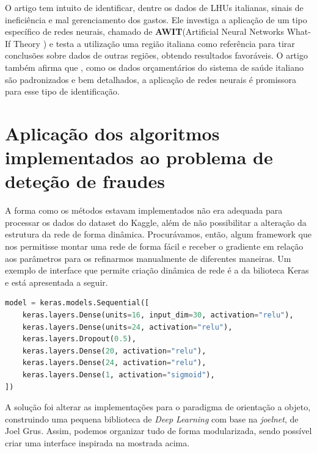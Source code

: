 \documentclass[11pt]{article}
\begin{document}
\noindent
O artigo \cite{fraudeItalia2} tem intuito de identificar, dentre os dados de LHUs italianas, sinais de ineficiência e mal gerenciamento dos gastos. Ele investiga a aplicação de um tipo específico de redes neurais, chamado de \textbf{AWIT}\supercite{AWIT}(Artificial Neural Networks What-If Theory ) e testa a utilização uma região italiana como referência para tirar conclusões sobre dados de outras regiões, obtendo  resultados favoráveis. O artigo também afirma que , como os dados orçamentários do sistema de saúde italiano são padronizados e bem detalhados, a aplicação de redes neurais é promissora para esse tipo de identificação.


\section{Aplicação dos algoritmos implementados ao problema de deteção de fraudes}

A forma como os métodos estavam implementados não era adequada para processar os dados do dataset do Kaggle, além de não possibilitar a alteração da estrutura da rede de forma dinâmica. Procurávamos, então, algum framework que nos permitisse montar uma rede de forma fácil e receber o gradiente em relação aos parâmetros para os refinarmos manualmente de diferentes maneiras. Um exemplo de interface que permite criação dinâmica de rede é a da bilioteca Keras\supercite{KERAS} e está apresentada a seguir.\\
\begin{lstlisting}[language=Python, caption=Interface do Keras]
model = keras.models.Sequential([
    keras.layers.Dense(units=16, input_dim=30, activation="relu"),
    keras.layers.Dense(units=24, activation="relu"),  
    keras.layers.Dropout(0.5),  
    keras.layers.Dense(20, activation="relu"),  
    keras.layers.Dense(24, activation="relu"),  
    keras.layers.Dense(1, activation="sigmoid"),  
])
\end{lstlisting}


\noindent
A solução foi alterar as implementações para o paradigma de orientação a objeto, construindo uma pequena biblioteca de \textit{Deep Learning} com base na \textit{joelnet}\supercite{joelnet}, de Joel Grus. Assim, podemos organizar tudo de forma modularizada, sendo possível criar uma interface inspirada na mostrada acima.
\end{document}
